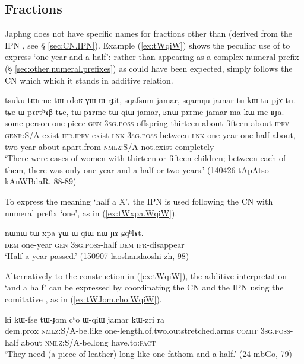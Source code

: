 \subsection{Fractions} \label{sec:fractions}
Japhug does not have specific names for fractions other than  (derived from the IPN , see § \ref{sec:CN.IPN}). Example (\ref{ex:tWqiW}) shows the peculiar use of  to express `one year and a half': rather than appearing as a complex numeral prefix (§ \ref{sec:other.numeral.prefixes}) as could have been expected,    simply follows the CN  which which it stands in additive relation.

\begin{exe}
\ex \label{ex:tWqiW}
 \gll tsuku tɯrme tɯ-rdoʁ ɣɯ ɯ-rɟit, sqafsum jamar, sqamŋu jamar tu-kɯ-tu pjɤ-tu. tɕe ɯ-pɤrtʰɤβ tɕe, tɯ-pɤrme tɯ-qiɯ jamar, ʁnɯ-pɤrme jamar ma kɯ-me ʁɟa. \\
 some person one-piece \textsc{gen} \textsc{3sg}.\textsc{poss}-offspring thirteen about fifteen about \textsc{ipfv}-\textsc{genr}:S/A-exist \textsc{ifr}.\textsc{ipfv}-exist  \textsc{lnk} \textsc{3sg}.\textsc{poss}-between \textsc{lnk} one-year one-half about, two-year about apart.from \textsc{nmlz}:S/A-not.exist completely  \\
 \glt  `There were cases of women with thirteen or fifteen children; between each of them, there was only one year and a half or two years.' (140426 tApAtso kAnWBdaR, 88-89)
\end{exe}

To express the meaning `half a X', the IPN  is used following the CN with numeral prefix `one', as in (\ref{ex:tWxpa.WqiW}).

\begin{exe}
\ex \label{ex:tWxpa.WqiW}
 \gll nɯnɯ tɯ-xpa ɣɯ ɯ-qiɯ nɯ ɲɤ-ɕqʰlɤt. \\
\textsc{dem} one-year \textsc{gen} \textsc{3sg}.\textsc{poss}-half \textsc{dem} \textsc{ifr}-disappear \\
\glt  `Half a year passed.' (150907 laoshandaoshi-zh, 98)
\end{exe}

Alternatively to the construction in (\ref{ex:tWqiW}), the additive interpretation  `and a half' can be expressed by coordinating the CN and the IPN  using the comitative , as in (\ref{ex:tWJom.cho.WqiW}).

\begin{exe}
\ex \label{ex:tWJom.cho.WqiW}
 \gll ki kɯ-fse tɯ-ɟom cʰo ɯ-qiɯ jamar kɯ-zri ra \\
 dem.prox \textsc{nmlz}:S/A-be.like one-length.of.two.outstretched.arms \textsc{comit} \textsc{3sg}.\textsc{poss}-half about \textsc{nmlz}:S/A-be.long have.to:\textsc{fact} \\
\glt `They need (a piece of leather) long like one fathom and a half.' (24-mbGo, 79)
\end{exe}

